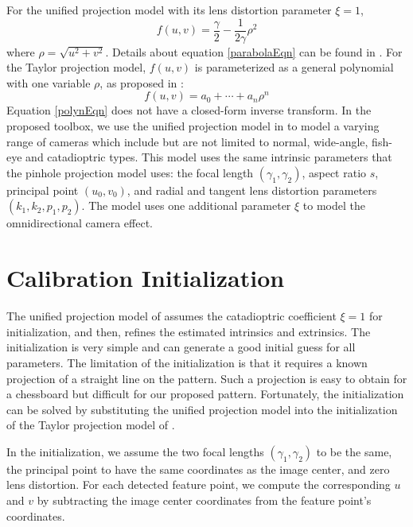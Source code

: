 \documentclass{report}
\begin{document}
For the unified projection model with its lens distortion parameter $\xi = 1$,
\begin{equation}
f(u, v) = \frac{\gamma}{2} - \frac{1}{2 \gamma} \rho^2
\label{parabolaEqn}
\end{equation}
where $\rho = \sqrt{u^2 + v^2}$. Details about equation \ref{parabolaEqn} can be found in \cite{mei2007single}. For the Taylor projection model, $f(u, v)$ is parameterized as a general polynomial with one variable $\rho$, as proposed in \cite{scaramuzza2006toolbox}: 
\begin{equation}
f(u, v) = a_0 + \cdots + a_n \rho^n
\label{polynEqn}
\end{equation}
Equation \ref{polynEqn} does not have a closed-form inverse transform. In the proposed toolbox, we use the unified projection model in \cite{mei2007single} to model a varying range of cameras which include but are not limited to normal, wide-angle, fish-eye and catadioptric types. This model uses the same intrinsic parameters that the pinhole projection model uses: the focal length $(\gamma_1, \gamma_2)$, aspect ratio $s$, principal point $(u_0, v_0)$, and radial and tangent lens distortion parameters $(k_1, k_2, p_1, p_2)$. The model uses one additional parameter $\xi$ to model the omnidirectional camera effect. 


\section{Calibration Initialization}

The unified projection model of \cite{mei2007single} assumes the catadioptric coefficient $\xi = 1$ for initialization, and then, refines the estimated intrinsics and extrinsics. The initialization is very simple and can generate a good initial guess for all parameters. The limitation of the initialization is that it requires a known projection of a straight line on the pattern. Such a projection is easy to obtain for a chessboard but difficult for our proposed pattern. Fortunately, the initialization can be solved by substituting the unified projection model into the initialization of the Taylor projection model of \cite{scaramuzza2006toolbox}.

In the initialization, we assume the two focal lengths $(\gamma_1, \gamma_2)$ to be the same, the principal point to have the same coordinates as the image center, and zero lens distortion. For each detected feature point, we compute the corresponding $u$ and $v$ by subtracting the image center coordinates from the feature point's coordinates.
\end{document}

